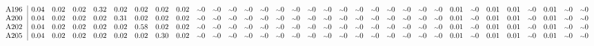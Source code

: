 \begin{table}[H]
\begin{center}
\begin{math}
\begin{array}{c|cccccccccccccccccccccccccccccccc}
\mathrm{A196} \hspace*{2pt} &       0.04 &       0.02 &       0.02 &       0.32 &       0.02 &       0.02 &       0.02 &       0.02 &  {\scriptstyle \sim }0 &  {\scriptstyle \sim }0 &  {\scriptstyle \sim }0 &  {\scriptstyle \sim }0 &  {\scriptstyle \sim }0 &  {\scriptstyle \sim }0 &  {\scriptstyle \sim }0 &  {\scriptstyle \sim }0 &  {\scriptstyle \sim }0 &  {\scriptstyle \sim }0 &  {\scriptstyle \sim }0 &  {\scriptstyle \sim }0 &  {\scriptstyle \sim }0 &  {\scriptstyle \sim }0 &  {\scriptstyle \sim }0 &  {\scriptstyle \sim }0 &       0.01 &  {\scriptstyle \sim }0 &       0.01 &       0.01 &  {\scriptstyle \sim }0 &       0.01 &  {\scriptstyle \sim }0 &  {\scriptstyle \sim }0 \\
\mathrm{A200} \hspace*{2pt} &       0.04 &       0.02 &       0.02 &       0.02 &       0.31 &       0.02 &       0.02 &       0.02 &  {\scriptstyle \sim }0 &  {\scriptstyle \sim }0 &  {\scriptstyle \sim }0 &  {\scriptstyle \sim }0 &  {\scriptstyle \sim }0 &  {\scriptstyle \sim }0 &  {\scriptstyle \sim }0 &  {\scriptstyle \sim }0 &  {\scriptstyle \sim }0 &  {\scriptstyle \sim }0 &  {\scriptstyle \sim }0 &  {\scriptstyle \sim }0 &  {\scriptstyle \sim }0 &  {\scriptstyle \sim }0 &  {\scriptstyle \sim }0 &  {\scriptstyle \sim }0 &       0.01 &  {\scriptstyle \sim }0 &       0.01 &       0.01 &  {\scriptstyle \sim }0 &       0.01 &  {\scriptstyle \sim }0 &  {\scriptstyle \sim }0 \\
\mathrm{A202} \hspace*{2pt} &       0.04 &       0.02 &       0.02 &       0.02 &       0.02 &       0.58 &       0.02 &       0.02 &  {\scriptstyle \sim }0 &  {\scriptstyle \sim }0 &  {\scriptstyle \sim }0 &  {\scriptstyle \sim }0 &  {\scriptstyle \sim }0 &  {\scriptstyle \sim }0 &  {\scriptstyle \sim }0 &  {\scriptstyle \sim }0 &  {\scriptstyle \sim }0 &  {\scriptstyle \sim }0 &  {\scriptstyle \sim }0 &  {\scriptstyle \sim }0 &  {\scriptstyle \sim }0 &  {\scriptstyle \sim }0 &  {\scriptstyle \sim }0 &  {\scriptstyle \sim }0 &       0.01 &  {\scriptstyle \sim }0 &       0.01 &       0.01 &  {\scriptstyle \sim }0 &       0.01 &  {\scriptstyle \sim }0 &  {\scriptstyle \sim }0 \\
\mathrm{A205} \hspace*{2pt} &       0.04 &       0.02 &       0.02 &       0.02 &       0.02 &       0.02 &       0.30 &       0.02 &  {\scriptstyle \sim }0 &  {\scriptstyle \sim }0 &  {\scriptstyle \sim }0 &  {\scriptstyle \sim }0 &  {\scriptstyle \sim }0 &  {\scriptstyle \sim }0 &  {\scriptstyle \sim }0 &  {\scriptstyle \sim }0 &  {\scriptstyle \sim }0 &  {\scriptstyle \sim }0 &  {\scriptstyle \sim }0 &  {\scriptstyle \sim }0 &  {\scriptstyle \sim }0 &  {\scriptstyle \sim }0 &  {\scriptstyle \sim }0 &  {\scriptstyle \sim }0 &       0.01 &  {\scriptstyle \sim }0 &       0.01 &       0.01 &  {\scriptstyle \sim }0 &       0.01 &  {\scriptstyle \sim }0 &  {\scriptstyle \sim }0 \\

\end{array}
\end{math}
\end{center}
\end{table}
